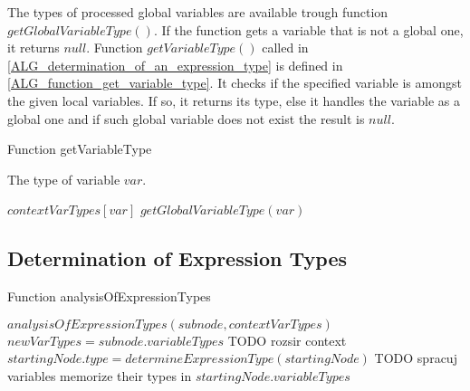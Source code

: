 The types of processed global variables are available trough function $getGlobalVariableType()$. If the function gets a variable that is not a global one, it returns $null$. Function $getVariableType()$ called in \ref{ALG_determination_of_an_expression_type} is defined in \ref{ALG_function_get_variable_type}. It checks if the specified variable is amongst the given local variables. If so, it returns its type, else it handles the variable as a global one and if such global variable does not exist the result is $null$.

\begin{algorithm}
\caption{Function getVariableType}
\label{ALG_function_get_variable_type}
\begin{algorithmic}[1]
\ENSURE The type of variable $var$.

     \RETURN $contextVarTypes[var]$
\ELSE
     \RETURN $getGlobalVariableType(var)$
\ENDIF
\end{algorithmic}
\end{algorithm}

\subsection{Determination of Expression Types}

\begin{algorithm}
\caption{Function analysisOfExpressionTypes}
\label{ALG_func_analysisOfExpressionTypes}
\begin{algorithmic}[1]

    \STATE $analysisOfExpressionTypes(subnode, contextVarTypes)$ 
        \STATE $newVarTypes = subnode.variableTypes$
        \STATE TODO rozsir context
    \ENDIF
\ENDFOR
{}
    \STATE $startingNode.type = determineExpressionType(startingNode)$
\ENDIF
{}
    \STATE TODO spracuj variables
    \STATE memorize their types in $startingNode.variableTypes$
\ENDIF
\end{algorithmic}
\end{algorithm}



